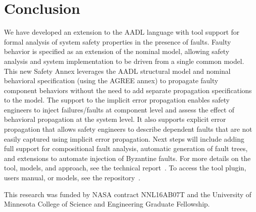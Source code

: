 \section{Conclusion}


We have developed an extension to the AADL language with tool support for formal analysis of system safety properties in the presence of faults. Faulty behavior is specified as an extension of the nominal model, allowing safety analysis and system implementation to be driven from a single common model. This new Safety Annex leverages the AADL structural model and nominal behavioral specification (using the AGREE annex) to propagate faulty component behaviors without the need to add separate propagation specifications to the model. The support to the implicit %
error propagation enables safety engineers to inject failures/faults at component level and assess the effect of behavioral propagation at the system level. It also supports explicit 
error propagation that allows safety engineers to describe dependent faults that are not easily captured using implicit %
error propagation. Next steps will include adding full support for compositional fault analysis, automatic generation of fault trees, and extensions to automate injection of Byzantine faults. For more details on the tool, models, and approach, see the technical report~\cite{SATechReport}. To access the tool plugin, users manual, or models, see the repository~\cite{SAGithub}. 


\vspace{2 mm}
 This research was funded by NASA contract NNL16AB07T and the University of Minnesota College of Science and Engineering Graduate Fellowship.



